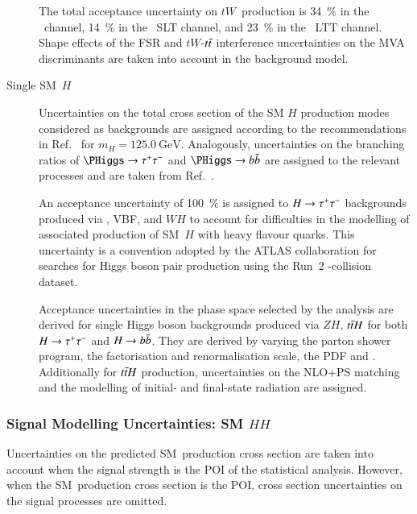\begin{description}
  The total acceptance uncertainty on $tW$~production is \SI{34}{\percent} in
  the \hadhad~channel, \SI{14}{\percent} in the \lephad~SLT channel, and
  \SI{23}{\percent} in the \lephad~LTT channel. Shape effects of the FSR and
  $tW$-$t\bar{t}$ interference uncertainties on the MVA discriminants are taken
  into account in the background model.

\item[Single SM~$H$] Uncertainties on the total cross section of the SM $H$
  production modes considered as backgrounds are assigned according to the
  recommendations in Ref.~\cite{deFlorian:2016spz} for
  $m_{H} = \SI{125.0}{\GeV}$. Analogously, uncertainties on the branching ratios
  of $\PHiggs \to \tautau$ and $\PHiggs \to \bbbar$ are assigned to the relevant
  processes and are taken from Ref.~\cite{deFlorian:2016spz}.

  An acceptance uncertainty of \SI{100}{\percent} is assigned to $H \to \tau^{+} \tau^{-}$
  backgrounds produced via \ggF, VBF, and $WH$ to account for difficulties in
  the modelling of associated production of SM~$H$ with heavy flavour
  quarks. This uncertainty is a convention adopted by the ATLAS collaboration
  for searches for Higgs boson pair production using the Run~2 \pp-collision
  dataset.

  Acceptance uncertainties in the phase space selected by the analysis are
  derived for single Higgs boson backgrounds produced via $ZH$, $t\bar{t} H$ for
  both $H \to \tau^{+} \tau^{-}$ and $H \to b\bar{b}$. They are derived by varying the
  parton shower program, the factorisation and renormalisation scale, the PDF
  and \alphas. Additionally for $t\bar{t} H$ production, uncertainties on the
  NLO+PS matching and the modelling of initial- and final-state radiation are
  assigned.
\end{description}





\subsubsection{Signal Modelling Uncertainties: SM $HH$}

Uncertainties on the predicted SM~\HH production cross section are taken into
account when the signal strength is the POI of the statistical
analysis. However, when the SM~\HH production cross section is the POI, cross
section uncertainties on the signal processes are omitted.

